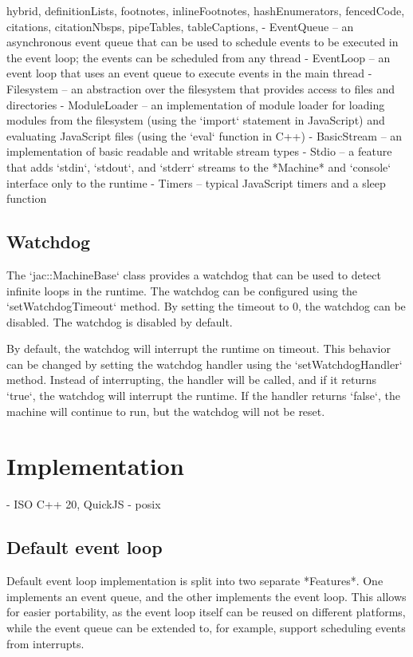 \documentclass[
  digital,
  oneside,
  nosansbold,
  nocolorbold,
  lof,
  lot
]{fithesis4}
\begin{document}
\begin{markdown*}{%
  hybrid,
  definitionLists,
  footnotes,
  inlineFootnotes,
  hashEnumerators,
  fencedCode,
  citations,
  citationNbsps,
  pipeTables,
  tableCaptions,
}
  - EventQueue -- an asynchronous event queue that can be used to schedule events to be executed in the event loop; the events can be scheduled from any thread
  - EventLoop -- an event loop that uses an event queue to execute events in the main thread
  - Filesystem -- an abstraction over the filesystem that provides access to files and directories
  - ModuleLoader -- an implementation of module loader for loading modules from the filesystem (using the `import` statement in JavaScript) and evaluating JavaScript files (using the `eval` function in C++)
  - BasicStream -- an implementation of basic readable and writable stream types
  - Stdio -- a feature that adds `stdin`, `stdout`, and `stderr` streams to the *Machine* and `console` interface only to the runtime
  - Timers -- typical JavaScript timers and a sleep function

\subsection{Watchdog}

The `jac::MachineBase` class provides a watchdog that can be used to detect infinite loops in the runtime. The watchdog can be configured using the `setWatchdogTimeout` method. By setting the timeout to 0, the watchdog can be disabled. The watchdog is disabled by default.

By default, the watchdog will interrupt the runtime on timeout. This behavior can be changed by setting the watchdog handler using the `setWatchdogHandler` method. Instead of interrupting, the handler will be called, and if it returns `true`, the watchdog will interrupt the runtime. If the handler returns `false`, the machine will continue to run, but the watchdog will not be reset.


\section{Implementation}

- ISO C++ 20, QuickJS - posix

\subsection{Default event loop}

Default event loop implementation is split into two separate *Features*. One implements an event queue, and the other implements the event loop. This allows for easier portability, as the event loop itself can be reused on different platforms, while the event queue can be extended to, for example, support scheduling events from interrupts.



\end{markdown*}
\end{document}
